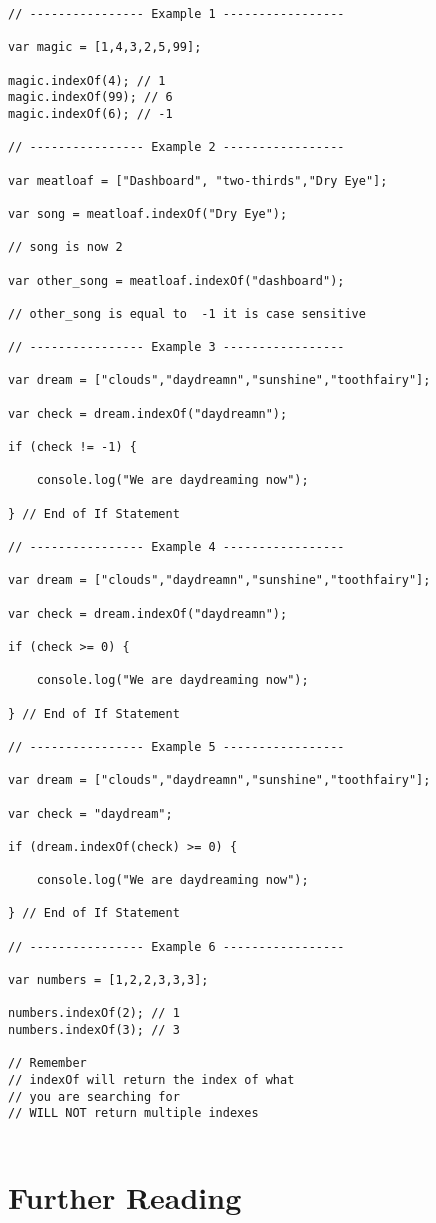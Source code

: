 \documentclass[12pt, letterpaper]{article}
\begin{document}
\begin{lstlisting}
// ---------------- Example 1 -----------------

var magic = [1,4,3,2,5,99];

magic.indexOf(4); // 1
magic.indexOf(99); // 6
magic.indexOf(6); // -1

// ---------------- Example 2 -----------------

var meatloaf = ["Dashboard", "two-thirds","Dry Eye"];

var song = meatloaf.indexOf("Dry Eye");

// song is now 2 

var other_song = meatloaf.indexOf("dashboard");

// other_song is equal to  -1 it is case sensitive 

// ---------------- Example 3 -----------------   

var dream = ["clouds","daydreamn","sunshine","toothfairy"];

var check = dream.indexOf("daydreamn");

if (check != -1) {

	console.log("We are daydreaming now");

} // End of If Statement

// ---------------- Example 4 -----------------

var dream = ["clouds","daydreamn","sunshine","toothfairy"];

var check = dream.indexOf("daydreamn");

if (check >= 0) {

	console.log("We are daydreaming now");

} // End of If Statement

// ---------------- Example 5 -----------------

var dream = ["clouds","daydreamn","sunshine","toothfairy"];

var check = "daydream";

if (dream.indexOf(check) >= 0) {

	console.log("We are daydreaming now");

} // End of If Statement

// ---------------- Example 6 -----------------

var numbers = [1,2,2,3,3,3];

numbers.indexOf(2); // 1
numbers.indexOf(3); // 3

// Remember
// indexOf will return the index of what 
// you are searching for 
// WILL NOT return multiple indexes 


\end{lstlisting}

\section*{Further Reading}
\end{document}
